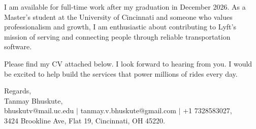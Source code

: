\documentclass[11pt]{letter}
\begin{document}
\begin{letter}{}
I am available for full-time work after my graduation in December 2026. As a Master's student at the University of Cincinnati and someone who values professionalism and growth, I am enthusiastic about contributing to Lyft's mission of serving and connecting people through reliable transportation software.

Please find my CV attached below. I look forward to hearing from you. I would be excited to help build the services that power millions of rides every day.

{\setlength{\parskip}{0pt}
Regards,\\
Tanmay Bhuskute,\\
bhuskutv@mail.uc.edu $\mid$ tanmay.v.bhuskute@gmail.com $\mid$ +1 7328583027,\\
3424 Brookline Ave, Flat 19, Cincinnati, OH 45220.
}

\end{letter}
\end{document}
